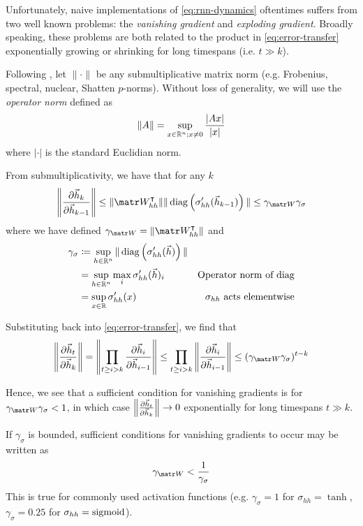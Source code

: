 Unfortunately, naive implementations of \cref{eq:rnn-dynamics} oftentimes suffers from two well known problems: the
\emph{vanishing gradient} and \emph{exploding gradient}\citep{Bengio1994}.
Broadly speaking, these problems are both related to the product in
\cref{eq:error-transfer} exponentially growing or shrinking for long
timespans (i.e. $t \gg k$).

Following \citet{Pascanu2012}, let $\| \cdot \|$ be any
submultiplicative matrix norm (e.g. Frobenius, spectral, nuclear, Shatten
$p$-norms). Without loss of generality, we will use the \emph{operator norm}
defined as
\begin{equation}
    \| A \| = \sup_{x \in \mathbb{R}^n; x \neq 0} \frac{|A x|}{|x|}
\end{equation}
where $|\cdot|$ is the standard Euclidian norm.

From submultiplicativity, we have that for any $k$
\begin{equation}
    \left\| \frac{\pd \h_k}{\pd \h_{k-1}} \right\|
    \leq \| \W_{hh}^\tp \| \| \diag\left( \sigma_{hh}'(\h_{k-1}) \right) \|
    \leq \gamma_{\W} \gamma_\sigma
\end{equation}
where we have defined $\gamma_{\W} = \| \W_{hh}^\tp \|$ and
\begin{align}
    \gamma_\sigma
    &\coloneqq \sup_{h \in \mathbb{R}^n} \| \operatorname*{diag} \left( \sigma_{hh}'(\vec{h}) \right) \|  &\\
    &= \sup_{h \in \mathbb{R}^n} \max_i \sigma_{hh}'(\vec{h})_i &\mbox{Operator norm of diag} \\
    &= \sup_{x \in \mathbb{R}} \sigma_{hh}'(x) &\mbox{$\sigma_{hh}$ acts elementwise}
\end{align}

Substituting back into \cref{eq:error-transfer}, we find that
\begin{equation}
    \left\| \frac{\pd \h_t}{\pd \h_k} \right\|
    = \left\| \prod_{t \geq i > k} \frac{\pd \h_i}{\pd \h_{i-1}} \right\|
    \leq  \prod_{t \geq i > k} \left\| \frac{\pd \h_i}{\pd \h_{i-1}} \right\|
    \leq (\gamma_{\W} \gamma_\sigma)^{t-k}
\end{equation}

Hence, we see that a sufficient condition for vanishing gradients is
for $\gamma_{\W} \gamma_\sigma < 1$, in which case $\left\| \frac{\partial \vec{h}_t}{\partial \vec{h}_k} \right\| \to 0$
exponentially for long timespans $t \gg k$. %

If $\gamma_\sigma$ is bounded, sufficient
conditions for vanishing gradients to occur may be written as
\begin{equation}
    \gamma_{\W} < \frac{1}{\gamma_\sigma}
    \label{eq:vanishing-gradients-suff}
\end{equation}
This is true for commonly used activation functions (e.g. $\gamma_\sigma = 1$
for $\sigma_{hh} = \tanh$, $\gamma_\sigma = 0.25$ for $\sigma_{hh} =
\operatorname*{sigmoid}$).

